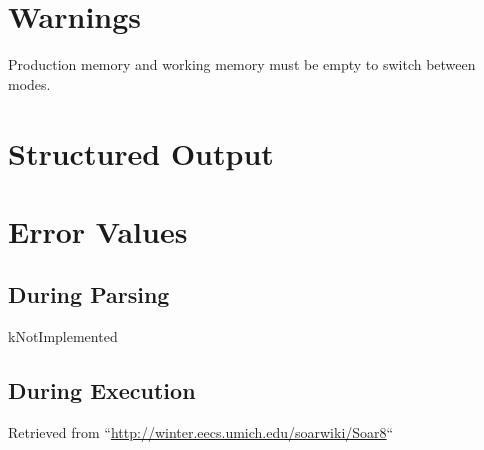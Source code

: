 \documentclass[10pt]{article}
\begin{document}
\section*{ Warnings }


 Production memory and working memory must be empty to switch between modes. 
\section*{ Structured Output }
\section*{ Error Values }
\subsection*{ During Parsing }


 kNotImplemented
\subsection*{ During Execution }
 Retrieved from ``\url{http://winter.eecs.umich.edu/soarwiki/Soar8}``
\end{document}
